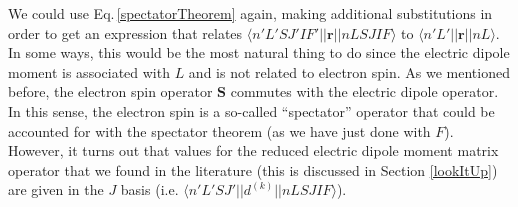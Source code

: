 We could use Eq.\,\ref{spectatorTheorem} again, making additional substitutions in order to get an expression that relates $\langle n' L' S J' I F' ||\mathbf{r}||n L S J I F\rangle$ to $\langle n' L'||\mathbf{r}||n L \rangle$. In some ways, this would be the most natural thing to do since the electric dipole moment is associated with $L$ and is not related to electron spin. As we mentioned before, the electron spin operator $\mathbf{S}$ commutes with the electric dipole operator. In this sense, the electron spin is a so-called ``spectator'' operator that could be accounted for with the spectator theorem (as we have just done with $F$). However, it turns out that values for the reduced electric dipole moment matrix operator that we found in the literature (this is discussed in Section \ref{lookItUp}) are given in the $J$ basis (i.e. $\langle n'L'S J'||d^{(k)}||n L S J I F\rangle$).

%
%
%


